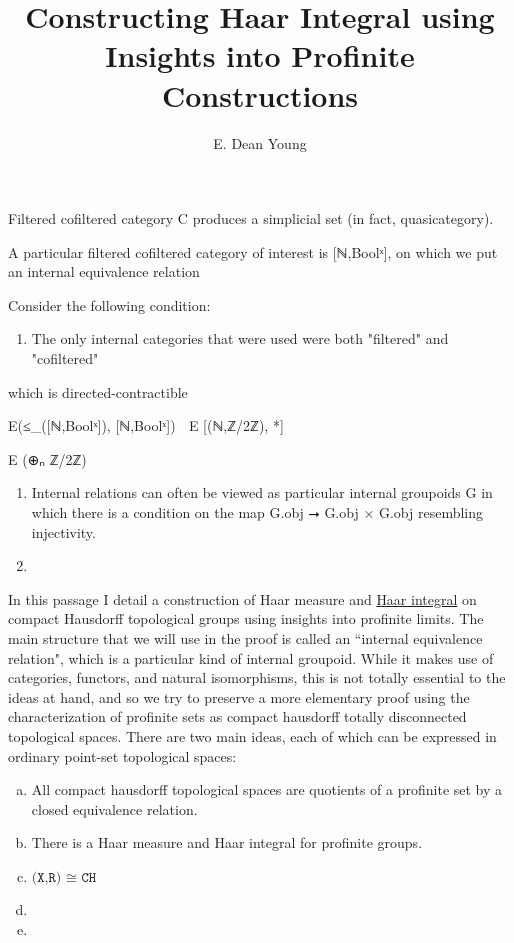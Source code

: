 \documentclass[13pt]{amsart}
\title{Constructing Haar Integral using Insights into Profinite Constructions}
\author{E. Dean Young}
\begin{document}
Filtered cofiltered category C produces a simplicial set (in fact, quasicategory).


A particular filtered cofiltered category of interest is [ℕ,Boolˣ], on which we put an internal equivalence relation

Consider the following condition:

\begin{enumerate}
\item The only internal categories that were used were both "filtered" and "cofiltered"
\end{enumerate}





 which is directed-contractible

E⃗(≤_([ℕ,Boolˣ]), [ℕ,Boolˣ]) ⭢ E [(ℕ,ℤ/2ℤ), *]

E (⊕ₙ ℤ/2ℤ)

\begin{enumerate}
\item Internal relations can often be viewed as particular internal groupoids G in which there is a condition on the map G.obj ⭢ G.obj × G.obj resembling injectivity. 
\item 
\end{enumerate}


In this passage I detail a construction of Haar measure and \href{https://mathoverflow.net/questions/351091/existence-and-uniqueness-of-haar-measure-on-compacta-a-cohomological-approach}{Haar integral} on compact Hausdorff topological groups using insights into profinite limits. The main structure that we will use in the proof is called an ``internal equivalence relation", which is a particular kind of internal groupoid. While it makes use of categories, functors, and natural isomorphisms, this is not totally essential to the ideas at hand, and so we try to preserve a more elementary proof using the characterization of profinite sets as compact hausdorff totally disconnected topological spaces. There are two main ideas, each of which can be expressed in ordinary point-set topological spaces:

\begin{enumerate}[(a)]
\item All compact hausdorff topological spaces are quotients of a profinite set by a closed equivalence relation.
\item There is a Haar measure and Haar integral for profinite groups.
\item $\texttt{(X,R) ≅ CH}$
\item 
\item 
\end{enumerate}
\end{document}
